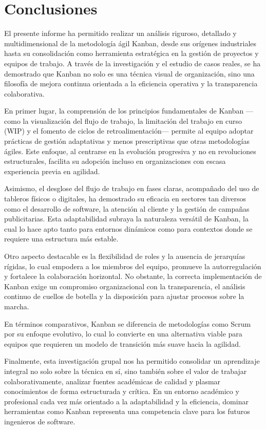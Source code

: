 \section{Conclusiones}

El presente informe ha permitido realizar un análisis riguroso, detallado y multidimensional de la metodología ágil Kanban, desde sus orígenes industriales hasta su consolidación como herramienta estratégica en la gestión de proyectos y equipos de trabajo. A través de la investigación y el estudio de casos reales, se ha demostrado que Kanban no solo es una técnica visual de organización, sino una filosofía de mejora continua orientada a la eficiencia operativa y la transparencia colaborativa.

En primer lugar, la comprensión de los principios fundamentales de Kanban —como la visualización del flujo de trabajo, la limitación del trabajo en curso (WIP) y el fomento de ciclos de retroalimentación— permite al equipo adoptar prácticas de gestión adaptativas y menos prescriptivas que otras metodologías ágiles. Este enfoque, al centrarse en la evolución progresiva y no en revoluciones estructurales, facilita su adopción incluso en organizaciones con escasa experiencia previa en agilidad.

Asimismo, el desglose del flujo de trabajo en fases claras, acompañado del uso de tableros físicos o digitales, ha demostrado su eficacia en sectores tan diversos como el desarrollo de software, la atención al cliente y la gestión de campañas publicitarias. Esta adaptabilidad subraya la naturaleza versátil de Kanban, la cual lo hace apto tanto para entornos dinámicos como para contextos donde se requiere una estructura más estable.

Otro aspecto destacable es la flexibilidad de roles y la ausencia de jerarquías rígidas, lo cual empodera a los miembros del equipo, promueve la autorregulación y fortalece la colaboración horizontal. No obstante, la correcta implementación de Kanban exige un compromiso organizacional con la transparencia, el análisis continuo de cuellos de botella y la disposición para ajustar procesos sobre la marcha.

En términos comparativos, Kanban se diferencia de metodologías como Scrum por su enfoque evolutivo, lo cual lo convierte en una alternativa viable para equipos que requieren un modelo de transición más suave hacia la agilidad.

Finalmente, esta investigación grupal nos ha permitido consolidar un aprendizaje integral no solo sobre la técnica en sí, sino también sobre el valor de trabajar colaborativamente, analizar fuentes académicas de calidad y plasmar conocimientos de forma estructurada y crítica. En un entorno académico y profesional cada vez más orientado a la adaptabilidad y la eficiencia, dominar herramientas como Kanban representa una competencia clave para los futuros ingenieros de software.
